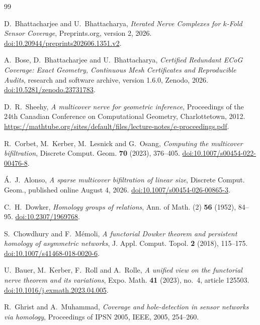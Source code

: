 \begin{thebibliography}{99}\raggedright
{}
D.~Bhattacharjee and U.~Bhattacharya,
\emph{Iterated Nerve Complexes for $k$-Fold Sensor Coverage},
Preprints.org, version 2, 2026.
\href{https://doi.org/10.20944/preprints202606.1351.v2}{doi:10.20944/preprints202606.1351.v2}.

A.~Bose, D.~Bhattacharjee and U.~Bhattacharya,
\emph{Certified Redundant ECoG Coverage: Exact Geometry, Continuous Mesh Certificates and Reproducible Audits},
research and software archive, version 1.6.0, Zenodo, 2026.
\href{https://doi.org/10.5281/zenodo.23731783}{doi:10.5281/zenodo.23731783}.

D.~R.~Sheehy,
\emph{A multicover nerve for geometric inference},
Proceedings of the 24th Canadian Conference on Computational Geometry, Charlottetown, 2012.
\url{https://mathtube.org/sites/default/files/lecture-notes/e-proceedings.pdf}.

R.~Corbet, M.~Kerber, M.~Lesnick and G.~Osang,
\emph{Computing the multicover bifiltration},
Discrete Comput. Geom. \textbf{70} (2023), 376--405.
\href{https://doi.org/10.1007/s00454-022-00476-8}{doi:10.1007/s00454-022-00476-8}.

\'{A}.~J.~Alonso,
\emph{A sparse multicover bifiltration of linear size},
Discrete Comput. Geom., published online August 4, 2026.
\href{https://doi.org/10.1007/s00454-026-00865-3}{doi:10.1007/s00454-026-00865-3}.

C.~H.~Dowker,
\emph{Homology groups of relations},
Ann. of Math. (2) \textbf{56} (1952), 84--95.
\href{https://doi.org/10.2307/1969768}{doi:10.2307/1969768}.

S.~Chowdhury and F.~M\'emoli,
\emph{A functorial Dowker theorem and persistent homology of asymmetric networks},
J. Appl. Comput. Topol. \textbf{2} (2018), 115--175.
\href{https://doi.org/10.1007/s41468-018-0020-6}{doi:10.1007/s41468-018-0020-6}.

U.~Bauer, M.~Kerber, F.~Roll and A.~Rolle,
\emph{A unified view on the functorial nerve theorem and its variations},
Expo. Math. \textbf{41} (2023), no.~4, article 125503.
\href{https://doi.org/10.1016/j.exmath.2023.04.005}{doi:10.1016/j.exmath.2023.04.005}.

R.~Ghrist and A.~Muhammad,
\emph{Coverage and hole-detection in sensor networks via homology},
Proceedings of IPSN 2005, IEEE, 2005, 254--260.


\end{thebibliography}
